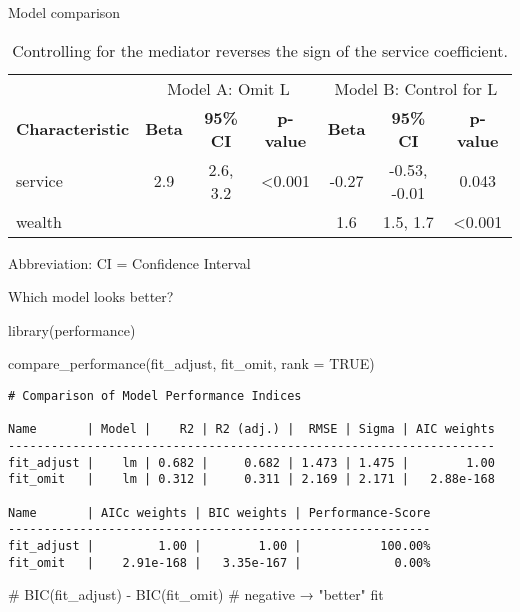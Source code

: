 \documentclass[
  ignorenonframetext,
  aspectratio=169,
  xcolor=\{dvipsnames\}]{beamer}
\newenvironment{Shaded}{\begin{snugshade}}{\end{snugshade}}
\newcommand{\AttributeTok}[1]{\textcolor[rgb]{0.40,0.45,0.13}{#1}}
\newcommand{\CommentTok}[1]{\textcolor[rgb]{0.37,0.37,0.37}{#1}}
\newcommand{\ConstantTok}[1]{\textcolor[rgb]{0.56,0.35,0.01}{#1}}
\newcommand{\FunctionTok}[1]{\textcolor[rgb]{0.28,0.35,0.67}{#1}}
\newcommand{\NormalTok}[1]{\textcolor[rgb]{0.00,0.23,0.31}{#1}}
\begin{document}
\begin{frame}{Model comparison}
\label{model-comparison}
\begin{table}
\caption{Controlling for the mediator reverses the sign of the service
coefficient.}\tabularnewline

\fontsize{12.0pt}{14.4pt}\selectfont
\begin{tabular*}{\linewidth}{@{\extracolsep{\fill}}lcccccc}
\toprule
 & \multicolumn{3}{c}{Model A: Omit L} & \multicolumn{3}{c}{Model B: Control for L} \\ 
\cmidrule(lr){2-4} \cmidrule(lr){5-7}
\textbf{Characteristic} & \textbf{Beta} & \textbf{95\% CI} & \textbf{p-value} & \textbf{Beta} & \textbf{95\% CI} & \textbf{p-value} \\ 
\midrule\addlinespace[2.5pt]
service & 2.9 & 2.6, 3.2 & <0.001 & -0.27 & -0.53, -0.01 & 0.043 \\ 
wealth &  &  &  & 1.6 & 1.5, 1.7 & <0.001 \\ 
\bottomrule
\end{tabular*}
\begin{minipage}{\linewidth}
Abbreviation: CI = Confidence Interval\\
\end{minipage}
\end{table}
\end{frame}

\begin{frame}[fragile]{Which model looks better?}
\label{which-model-looks-better}
\begin{Shaded}
\begin{Highlighting}[]
\FunctionTok{library}\NormalTok{(performance)}

\FunctionTok{compare\_performance}\NormalTok{(fit\_adjust, fit\_omit, }\AttributeTok{rank =} \ConstantTok{TRUE}\NormalTok{)}
\end{Highlighting}
\end{Shaded}

\begin{verbatim}
# Comparison of Model Performance Indices

Name       | Model |    R2 | R2 (adj.) |  RMSE | Sigma | AIC weights
--------------------------------------------------------------------
fit_adjust |    lm | 0.682 |     0.682 | 1.473 | 1.475 |        1.00
fit_omit   |    lm | 0.312 |     0.311 | 2.169 | 2.171 |   2.88e-168

Name       | AICc weights | BIC weights | Performance-Score
-----------------------------------------------------------
fit_adjust |         1.00 |        1.00 |           100.00%
fit_omit   |    2.91e-168 |   3.35e-167 |             0.00%
\end{verbatim}

\begin{Shaded}
\begin{Highlighting}[]
\CommentTok{\# BIC(fit\_adjust) {-} BIC(fit\_omit)  \# negative → "better" fit}
\end{Highlighting}
\end{Shaded}
\end{frame}
\end{document}
